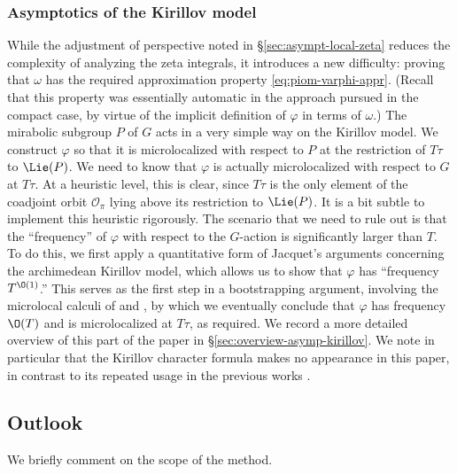 \subsubsection{Asymptotics of the Kirillov model}\label{sec:asympt-kirill-model}
While the adjustment of perspective noted in \S\ref{sec:asympt-local-zeta} reduces the complexity of analyzing the zeta integrals, it introduces a new difficulty: proving that $\omega$ has the required approximation property \eqref{eq:piom-varphi-appr}.  (Recall that this property was essentially automatic in the approach pursued in the compact case, by virtue of the implicit definition of $\varphi$ in terms of $\omega$.)  The mirabolic subgroup $P$ of $G$ acts in a very simple way on the Kirillov model.  We construct $\varphi$ so that it is microlocalized with respect to $P$ at the restriction of $T \tau$ to $\Lie(P)$.  We need to know that $\varphi$ is actually microlocalized with respect to $G$ at $T \tau$.  At a heuristic level, this is clear, since $T \tau$ is the only element of the coadjoint orbit $\mathcal{O}_\pi$ lying above its restriction to $\Lie(P)$.  It is a bit subtle to implement this heuristic rigorously.  The scenario that we need to rule out is that the ``frequency'' of $\varphi$ with respect to the $G$-action is significantly larger than $T$.  To do this, we first apply a quantitative form of Jacquet's arguments \cite[\S3]{MR2733072} concerning the archimedean Kirillov model, which allows us to show that $\varphi$ has ``frequency $T^{\O(1)}$.''  This serves as the first step in a bootstrapping argument, involving the microlocal calculi of \cite{nelson-venkatesh-1} and \cite{2020arXiv201202187N}, by which we eventually conclude that $\varphi$ has frequency $\O(T)$ and is microlocalized at $T \tau$, as required.  We record a more detailed overview of this part of the paper in \S\ref{sec:overview-asymp-kirillov}.  We note in particular that the Kirillov character formula makes no appearance in this paper, in contrast to its repeated usage in the previous works \cite{nelson-venkatesh-1, 2020arXiv201202187N}.

\subsection{Outlook}
We briefly comment on the scope of the method.

